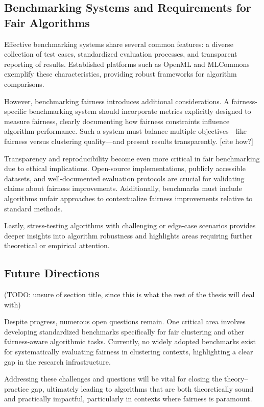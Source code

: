 \subsection{Benchmarking Systems and Requirements for Fair Algorithms}

Effective benchmarking systems share several common features: a
diverse collection of test cases, standardized evaluation processes,
and transparent reporting of results. Established platforms such as
OpenML and MLCommons exemplify these characteristics, providing
robust frameworks for algorithm comparisons.

However, benchmarking fairness introduces additional considerations.
A fairness-specific benchmarking system should incorporate metrics
explicitly designed to measure fairness, clearly documenting how
fairness constraints influence algorithm performance. Such a system
must balance multiple objectives—like fairness versus clustering
quality—and present results transparently. [cite how?]

Transparency and reproducibility become even more critical in fair
benchmarking due to ethical implications. Open-source
implementations, publicly accessible datasets, and well-documented
evaluation protocols are crucial for validating claims about fairness
improvements. Additionally, benchmarks must include algorithms unfair
approaches to contextualize fairness improvements
relative to standard methods.

Lastly, stress-testing algorithms with challenging or edge-case
scenarios provides deeper insights into algorithm
robustness and highlights areas requiring further theoretical or
empirical attention.

\subsection{Future Directions}
(TODO: unsure of section title, since this is what the rest of the
thesis will deal with)

Despite progress, numerous open questions remain. One critical area
involves developing standardized benchmarks specifically for fair
clustering and other fairness-aware algorithmic tasks. Currently, no
widely adopted benchmarks exist for systematically evaluating
fairness in clustering contexts, highlighting a clear gap in the
research infrastructure.

Addressing these challenges and questions will be vital for closing
the theory–practice gap, ultimately leading to algorithms that are
both theoretically sound and practically impactful, particularly in
contexts where fairness is paramount.

